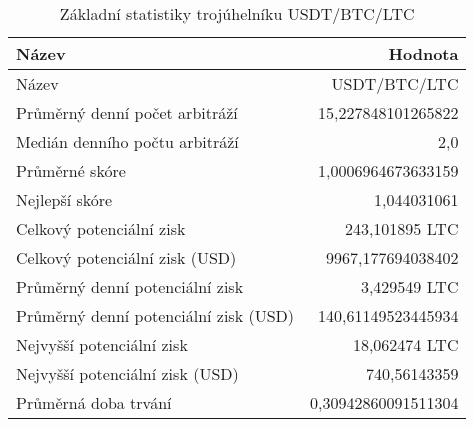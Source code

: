 \begin{table}\centering
\caption{Základní statistiky trojúhelníku USDT/BTC/LTC}
\label{USDTBTCLTC_stats}
\begin{tabular}{|| l | r ||}
\hline Název & Hodnota \\ 
\hline\hline Název & USDT/BTC/LTC \\ 
\hline Průměrný denní počet arbitráží & 15,227848101265822 \\ 
\hline Medián denního počtu arbitráží & 2,0 \\ 
\hline Průměrné skóre & 1,0006964673633159 \\ 
\hline Nejlepší skóre & 1,044031061 \\ 
\hline Celkový potenciální zisk & 243,101895 LTC \\ 
\hline Celkový potenciální zisk (USD) & 9967,177694038402 \\ 
\hline Průměrný denní potenciální zisk & 3,429549 LTC \\ 
\hline Průměrný denní potenciální zisk (USD) & 140,61149523445934 \\ 
\hline Nejvyšší potenciální zisk & 18,062474 LTC \\ 
\hline Nejvyšší potenciální zisk (USD) & 740,56143359 \\ 
\hline Průměrná doba trvání & 0,30942860091511304 \\ 
\hline
\end{tabular}
\end{table}